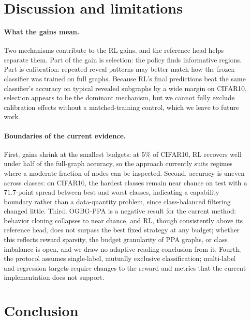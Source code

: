 \documentclass{article}
\begin{document}
\section{Discussion and limitations}
\label{sec:limitations}

\paragraph{What the gains mean.}
Two mechanisms contribute to the RL gains, and the reference head helps separate them. Part of the gain is selection: the policy finds informative regions. Part is calibration: repeated reveal patterns may better match how the frozen classifier was trained on full graphs. Because RL's final predictions beat the same classifier's accuracy on typical revealed subgraphs by a wide margin on CIFAR10, selection appears to be the dominant mechanism, but we cannot fully exclude calibration effects without a matched-training control, which we leave to future work.

\paragraph{Boundaries of the current evidence.}
First, gains shrink at the smallest budgets: at $5\%$ of CIFAR10, RL recovers well under half of the full-graph accuracy, so the approach currently suits regimes where a moderate fraction of nodes can be inspected. Second, accuracy is uneven across classes: on CIFAR10, the hardest classes remain near chance on test with a $71.7$-point spread between best and worst classes, indicating a capability boundary rather than a data-quantity problem, since class-balanced filtering changed little. Third, OGBG-PPA is a negative result for the current method: behavior cloning collapses to near chance, and RL, though consistently above its reference head, does not surpass the best fixed strategy at any budget; whether this reflects reward sparsity, the budget granularity of PPA graphs, or class imbalance is open, and we draw no adaptive-reading conclusion from it. Fourth, the protocol assumes single-label, mutually exclusive classification; multi-label and regression targets require changes to the reward and metrics that the current implementation does not support.

\section{Conclusion}
\label{sec:conclusion}
\end{document}
